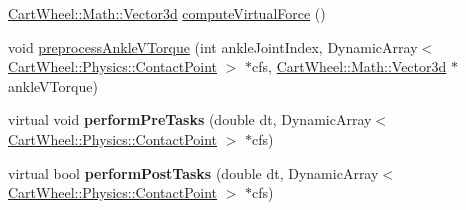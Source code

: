 \begin{DoxyCompactItemize}
\item 
\hyperlink{classCartWheel_1_1Math_1_1Vector3d}{CartWheel::Math::Vector3d} \hyperlink{classCartWheel_1_1Core_1_1IKVMCController_a8f7b679c31e3caf15c6499d50179f023}{computeVirtualForce} ()
\item 
void \hyperlink{classCartWheel_1_1Core_1_1IKVMCController_a9fed3d9a11852843f5847d0627447577}{preprocessAnkleVTorque} (int ankleJointIndex, DynamicArray$<$ \hyperlink{classCartWheel_1_1Physics_1_1ContactPoint}{CartWheel::Physics::ContactPoint} $>$ $\ast$cfs, \hyperlink{classCartWheel_1_1Math_1_1Vector3d}{CartWheel::Math::Vector3d} $\ast$ankleVTorque)
\item 
\hypertarget{classCartWheel_1_1Core_1_1IKVMCController_a01654bab74d1ac16e6c7d31192e17fdc}{
virtual void {\bfseries performPreTasks} (double dt, DynamicArray$<$ \hyperlink{classCartWheel_1_1Physics_1_1ContactPoint}{CartWheel::Physics::ContactPoint} $>$ $\ast$cfs)}
\label{classCartWheel_1_1Core_1_1IKVMCController_a01654bab74d1ac16e6c7d31192e17fdc}

\item 
\hypertarget{classCartWheel_1_1Core_1_1IKVMCController_a0276efd1859f7d86cd009cd1c26b70be}{
virtual bool {\bfseries performPostTasks} (double dt, DynamicArray$<$ \hyperlink{classCartWheel_1_1Physics_1_1ContactPoint}{CartWheel::Physics::ContactPoint} $>$ $\ast$cfs)}
\label{classCartWheel_1_1Core_1_1IKVMCController_a0276efd1859f7d86cd009cd1c26b70be}

\end{DoxyCompactItemize}
